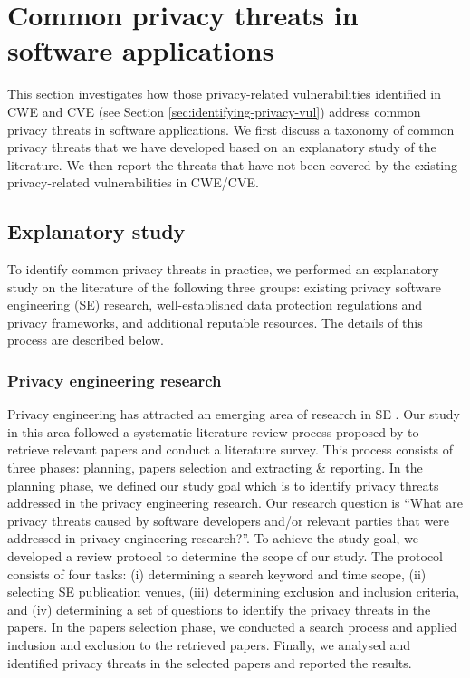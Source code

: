 \section{Common privacy threats in software applications} \label{sec:common-privacy-concerns}
This section investigates how those privacy-related vulnerabilities identified in CWE and CVE (see Section \ref{sec:identifying-privacy-vul}) address common privacy threats in software applications. We first discuss a taxonomy of common privacy threats that we have developed based on an explanatory study of the literature. We then report the threats that have not been covered by the existing privacy-related vulnerabilities in CWE/CVE.

\subsection{Explanatory study}

To identify common privacy threats in practice, we performed an explanatory study on the literature of the following three groups: existing privacy software engineering (SE) research, well-established data protection regulations and privacy frameworks, and additional reputable resources. The details of this process are described below.

\subsubsection{Privacy engineering research}
Privacy engineering has attracted an emerging area of research in SE \cite{Gurses2016}. Our study in this area followed a systematic literature review process proposed by \cite{Kitchenham2007a} to retrieve relevant papers and conduct a literature survey. This process consists of three phases: planning, papers selection and extracting \& reporting.%
In the planning phase, we defined our study goal which is to identify privacy threats addressed in the privacy engineering research. Our research question is ``What are privacy threats caused by software developers and/or relevant parties that were addressed in privacy engineering research?''. To achieve the study goal, we developed a review protocol to determine the scope of our study. The protocol consists of four tasks: (i) determining a search keyword and time scope, (ii) selecting SE publication venues, (iii) determining exclusion and inclusion criteria, and (iv) determining a set of questions to identify the privacy threats in the papers. In the papers selection phase, we conducted a search process and applied inclusion and exclusion to the retrieved papers. Finally, we analysed and identified privacy threats in the selected papers and reported the results.

